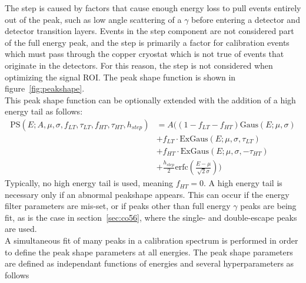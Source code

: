 \documentclass[/main.tex]{subfiles}
\begin{document}
The step is caused by factors that cause enough energy loss to pull events entirely out of the peak, such as low angle scattering of a $\gamma$ before entering a detector and detector transition layers.
Events in the step component are not considered part of the full energy peak, and the step is primarily a factor for calibration events which must pass through the copper cryostat which is not true of events that originate in the detectors.
For this reason, the step is not considered when optimizing the signal ROI.
The peak shape function is shown in figure~\ref{fig:peakshape}.
\\
This peak shape function can be optionally extended with the addition of a high energy tail as follows:
\begin{equation}
  \begin{aligned}
    \mathrm{PS}(E; A, \mu, \sigma, f_{LT}, \tau_{LT}, f_{HT}, \tau_{HT}, h_{step}) &= A\big((1-f_{LT}-f_{HT})\mathrm{Gaus}(E; \mu, \sigma) \\&+ f_{LT}\cdot\mathrm{ExGaus}(E; \mu, \sigma, \tau_{LT}) \\&+ f_{HT}\cdot\mathrm{ExGaus}(E; \mu, \sigma, -\tau_{HT}) \\&+ \frac{h_{step}}{2}\mathrm{erfc}(\frac{E-\mu}{\sqrt{2}\sigma})\big)
  \end{aligned}
\end{equation}
Typically, no high energy tail is used, meaning $f_{HT}=0$.
A high energy tail is necessary only if an abnormal peakshape appears.
This can occur if the energy filter parameters are mis-set, or if peaks other than full energy $\gamma$ peaks are being fit, as is the case in section~\ref{sec:co56}, where the single- and double-escape peaks are used.
\\
A simultaneous fit of many peaks in a calibration spectrum is performed in order to define the peak shape parameters at all energies.
The peak shape parameters are defined as independant functions of energies and several hyperparameters as follows
\end{document}
